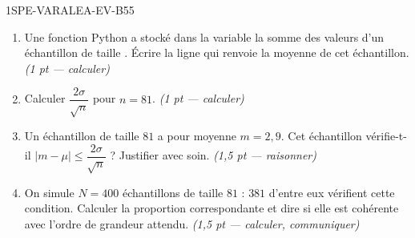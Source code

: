 \begin{evaluation}{1SPE-VARALEA-EV-B}{55}
\begin{enumerate}
  \item Une fonction Python a stocké dans la variable  la somme
        des valeurs d'un échantillon de taille . Écrire la ligne qui
        renvoie la moyenne de cet échantillon.
  \hfill\textit{(1 pt — calculer)}

  \item Calculer $\dfrac{2\sigma}{\sqrt{n}}$ pour $n = 81$.
  \hfill\textit{(1 pt — calculer)}

  \item Un échantillon de taille $81$ a pour moyenne $m = 2{,}9$.
        Cet échantillon vérifie-t-il $|m - \mu| \leq \dfrac{2\sigma}{\sqrt{n}}$ ?
        Justifier avec soin.
  \hfill\textit{(1{,}5 pt — raisonner)}

  \item On simule $N = 400$ échantillons de taille $81$ : $381$ d'entre eux
        vérifient cette condition. Calculer la proportion correspondante et
        dire si elle est cohérente avec l'ordre de grandeur attendu.
  \hfill\textit{(1{,}5 pt — calculer, communiquer)}
\end{enumerate}

\end{evaluation}
